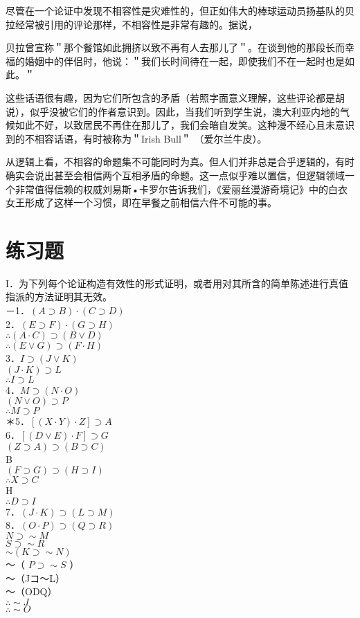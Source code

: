 尽管在一个论证中发现不相容性是灾难性的，但正如伟大的棒球运动员扬基队的贝拉经常被引用的评论那样，不相容性是非常有趣的。据说，

贝拉曾宣称＂那个餐馆如此拥挤以致不再有人去那儿了＂。在谈到他的那段长而幸福的婚姻中的伴侣时，他说：＂我们长时间待在一起，即使我们不在一起时也是如此。＂

这些话语很有趣，因为它们所包含的矛盾（若照字面意义理解，这些评论都是胡说），似乎没被它们的作者意识到。因此，当我们听到学生说，澳大利亚内地的气候如此不好，以致居民不再住在那儿了，我们会暗自发笑。这种漫不经心且未意识到的不相容话语，有时被称为＂Irish Bull＂ （爱尔兰牛皮）。

从逻辑上看，不相容的命题集不可能同时为真。但人们并非总是合乎逻辑的，有时确实会说出甚至会相信两个互相矛盾的命题。这一点似乎难以置信，但逻辑领域一个非常值得信赖的权威刘易斯•卡罗尔告诉我们，《爱丽丝漫游奇境记》中的白衣女王形成了这样一个习惯，即在早餐之前相信六件不可能的事。

\section*{练习题}
I．为下列每个论证构造有效性的形式证明，或者用对其所含的简单陈述进行真值指派的方法证明其无效。\\
－1．$(A \supset B) \cdot(C \supset D)$\\
2．$(E \supset F) \cdot(G \supset H)$\\
$\therefore(A \cdot C) \supset(B \vee D)$\\
$\therefore(E \vee G) \supset(F \cdot H)$\\
3．$I \supset(J \vee K)$\\
$(J \cdot K) \supset L$\\
$\therefore I \supset L$\\
4．$M \supset(N \cdot O)$\\
$(N \vee O) \supset P$\\
$\therefore M \supset P$\\
＊5．$[(X \cdot Y) \cdot Z] \supset A$\\
6．$[(D \vee E) \cdot F] \supset G$\\
$(Z \supset A) \supset(B \supset C)$\\
B\\
$(F \supset G) \supset(H \supset I)$\\
$\therefore X \supset C$\\
H\\
$\therefore D \supset I$\\
7．$(J \cdot K) \supset(L \supset M)$\\
8．$(O \cdot P) \supset(Q \supset R)$\\
$N \supset \sim M$\\
$S \supset \sim R$\\
$\sim(K \supset \sim N)$\\
～（ $P \supset \sim S$ ）\\
～（Jコ～L）\\
～（ODQ）\\
$\therefore \sim J$\\
$\therefore \sim O$

